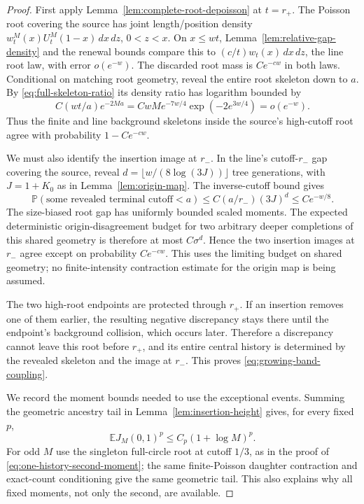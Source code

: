 \documentclass[11pt,letterpaper]{article}
\newcommand{\PP}{\mathbb P}\newcommand{\EE}{\mathbb E}
\begin{document}
\begin{proof}
First apply Lemma~\ref{lem:complete-root-depoisson} at $t=r_+$.
The Poisson root covering the source has joint length/position
density $w_t^M(x)U_t^M(1-x)\,dx\,dz$, $0<z<x$.
On $x\le wt$, Lemma~\ref{lem:relative-gap-density} and the renewal
bounds compare this to
$(c/t)w_t(x)\,dx\,dz$, the line root law, with error $o(e^{-w})$.
The discarded root mass is $Ce^{-cw}$ in both laws. Conditional
on matching root geometry, reveal the entire root skeleton down
to $a$. By \eqref{eq:full-skeleton-ratio} its density ratio has
logarithm bounded by
\[
 C(wt/a)e^{-2Ma}
       =CwM e^{-7w/4}\exp(-2e^{3w/4})=o(e^{-w}).
\]
Thus the finite and line background skeletons inside the source's
high-cutoff root agree with probability $1-Ce^{-cw}$.

We must also identify the insertion image at $r_-$.
In the line's cutoff-$r_-$ gap covering the source, reveal
$d=\lfloor w/(8\log(3J))\rfloor$ tree generations, with
$J=1+K_0$ as in Lemma~\ref{lem:origin-map}.
The inverse-cutoff bound gives
\[
 \PP(\text{some revealed terminal cutoff}<a)
       \le C(a/r_-)(3J)^d\le Ce^{-w/8}.
\]
The size-biased root gap has uniformly bounded scaled moments.
The expected deterministic origin-disagreement budget for two
arbitrary deeper completions of this shared geometry is therefore
at most $C\sigma^d$. Hence the two insertion images at $r_-$ agree
except on probability $Ce^{-cw}$. This uses the limiting budget
on shared geometry; no finite-intensity contraction estimate for
the origin map is being assumed.

The two high-root endpoints are protected through $r_+$.
If an insertion removes one of them earlier, the resulting negative
discrepancy stays there until the endpoint's background collision,
which occurs later. Therefore a discrepancy cannot leave this
root before $r_+$, and its entire central history is determined
by the revealed skeleton and the image at $r_-$.
This proves \eqref{eq:growing-band-coupling}.

We record the moment bounds needed to use the exceptional events.
Summing the geometric ancestry tail in
Lemma~\ref{lem:insertion-height} gives, for every fixed $p$,
\begin{equation}\label{eq:all-history-moments}
 \EE J_M(0,1)^p\le C_p(1+\log M)^p.
\end{equation}
For odd $M$ use the singleton full-circle root at cutoff $1/3$,
as in the proof of \eqref{eq:one-history-second-moment};
the same finite-Poisson daughter contraction and exact-count
conditioning give the same geometric tail. This also explains
why all fixed moments, not only the second, are available.


\end{proof}
\end{document}
